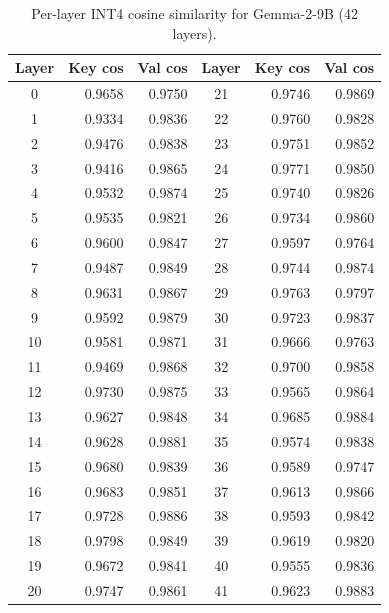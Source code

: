 \documentclass[11pt]{article}
\theoremstyle{plain}
\theoremstyle{definition}
\begin{document}
\begin{table}[H]
\centering
\caption{Per-layer INT4 cosine similarity for Gemma-2-9B (42 layers).}
\label{tab:per-layer-gemma}
\small
\begin{tabular}{crr|crr}
\toprule
Layer & Key cos & Val cos & Layer & Key cos & Val cos \\
\midrule
0 & 0.9658 & 0.9750 & 21 & 0.9746 & 0.9869 \\
1 & 0.9334 & 0.9836 & 22 & 0.9760 & 0.9828 \\
2 & 0.9476 & 0.9838 & 23 & 0.9751 & 0.9852 \\
3 & 0.9416 & 0.9865 & 24 & 0.9771 & 0.9850 \\
4 & 0.9532 & 0.9874 & 25 & 0.9740 & 0.9826 \\
5 & 0.9535 & 0.9821 & 26 & 0.9734 & 0.9860 \\
6 & 0.9600 & 0.9847 & 27 & 0.9597 & 0.9764 \\
7 & 0.9487 & 0.9849 & 28 & 0.9744 & 0.9874 \\
8 & 0.9631 & 0.9867 & 29 & 0.9763 & 0.9797 \\
9 & 0.9592 & 0.9879 & 30 & 0.9723 & 0.9837 \\
10 & 0.9581 & 0.9871 & 31 & 0.9666 & 0.9763 \\
11 & 0.9469 & 0.9868 & 32 & 0.9700 & 0.9858 \\
12 & 0.9730 & 0.9875 & 33 & 0.9565 & 0.9864 \\
13 & 0.9627 & 0.9848 & 34 & 0.9685 & 0.9884 \\
14 & 0.9628 & 0.9881 & 35 & 0.9574 & 0.9838 \\
15 & 0.9680 & 0.9839 & 36 & 0.9589 & 0.9747 \\
16 & 0.9683 & 0.9851 & 37 & 0.9613 & 0.9866 \\
17 & 0.9728 & 0.9886 & 38 & 0.9593 & 0.9842 \\
18 & 0.9798 & 0.9849 & 39 & 0.9619 & 0.9820 \\
19 & 0.9672 & 0.9841 & 40 & 0.9555 & 0.9836 \\
20 & 0.9747 & 0.9861 & 41 & 0.9623 & 0.9883 \\
\bottomrule
\end{tabular}
\end{table}
\end{document}

